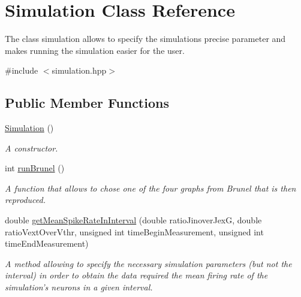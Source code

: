 \hypertarget{classSimulation}{\section{Simulation Class Reference}
\label{classSimulation}
}


The class simulation allows to specify the simulations precise parameter and makes running the simulation easier for the user.  




{\ttfamily \#include $<$simulation.\-hpp$>$}

\subsection*{Public Member Functions}
\begin{DoxyCompactItemize}
\item 
\hypertarget{classSimulation_a5b224cc5b36bcc8eb29689aff223de41}{\hyperlink{classSimulation_a5b224cc5b36bcc8eb29689aff223de41}{Simulation} ()}\label{classSimulation_a5b224cc5b36bcc8eb29689aff223de41}

\begin{DoxyCompactList}\small\item\em A constructor. \end{DoxyCompactList}\item 
int \hyperlink{classSimulation_a46506067eba805c7a282832b404c671f}{run\-Brunel} ()
\begin{DoxyCompactList}\small\item\em A function that allows to chose one of the four graphs from Brunel that is then reproduced. \end{DoxyCompactList}\item 
double \hyperlink{classSimulation_acf963fa9fa6621ec7f98f743ffbd96f5}{get\-Mean\-Spike\-Rate\-In\-Interval} (double ratio\-Jinover\-Jex\-G, double ratio\-Vext\-Over\-Vthr, unsigned int time\-Begin\-Measurement, unsigned int time\-End\-Measurement)
\begin{DoxyCompactList}\small\item\em A method allowing to specify the necessary simulation parameters (but not the interval) in order to obtain the data required the mean firing rate of the simulation's neurons in a given interval. \end{DoxyCompactList}\end{DoxyCompactItemize}
